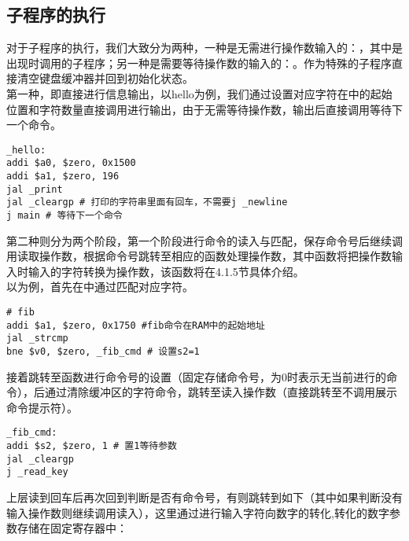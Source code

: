 \subsection{子程序的执行}
\songti
\hspace*{5mm}对于子程序的执行，我们大致分为两种，一种是无需进行操作数输入的：，其中是出现时调用的子程序；另一种是需要等待操作数的输入的：。作为特殊的子程序直接清空键盘缓冲器并回到初始化状态。
\kaishu
\\\hspace*{5mm}第一种，即直接进行信息输出，以hello为例，我们通过设置对应字符在中的起始位置和字符数量直接调用进行输出，由于无需等待操作数，输出后直接调用等待下一个命令。
\begin{lstlisting}[style=assembler-style, caption={hello}]
_hello:
addi $a0, $zero, 0x1500
addi $a1, $zero, 196
jal _print
jal _cleargp # 打印的字符串里面有回车，不需要j _newline
j main # 等待下一个命令
\end{lstlisting}
\hspace*{5mm}第二种则分为两个阶段，第一个阶段进行命令的读入与匹配，保存命令号后继续调用读取操作数，根据命令号跳转至相应的函数处理操作数，其中函数将把操作数输入时输入的字符转换为操作数，该函数将在4.1.5节具体介绍。
\\\hspace*{5mm}以为例，首先在中通过匹配对应字符。
\begin{lstlisting}[style=assembler-style, caption={fib-judge}]
# fib
addi $a1, $zero, 0x1750 #fib命令在RAM中的起始地址
jal _strcmp
bne $v0, $zero, _fib_cmd # 设置s2=1
\end{lstlisting}
\hspace*{5mm}接着跳转至函数进行命令号的设置（固定存储命令号，为0时表示无当前进行的命令），后通过清除缓冲区的字符命令，跳转至读入操作数（直接跳转至不调用展示命令提示符）。
\begin{lstlisting}[style=assembler-style, caption={fib\_cmd}]
_fib_cmd:
addi $s2, $zero, 1 # 置1等待参数
jal _cleargp
j _read_key
\end{lstlisting}
\hspace*{5mm}上层读到回车后再次回到判断是否有命令号，有则跳转到如下（其中如果判断没有输入操作数则继续调用读入），这里通过进行输入字符向数字的转化,转化的数字参数存储在固定寄存器中：

